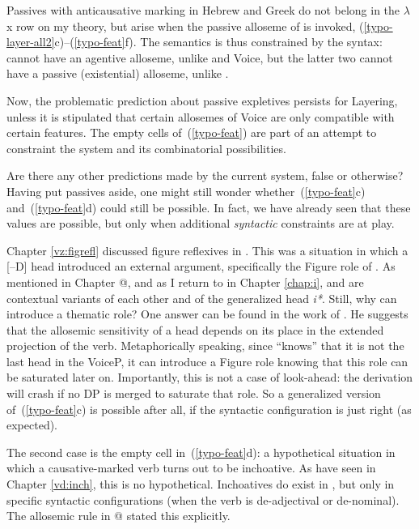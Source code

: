 Passives with anticausative marking in Hebrew and Greek do not belong in the $\lambda$x row on my theory, but arise when the passive alloseme of {\vd} is invoked, (\ref{typo-layer-all2}c)--(\ref{typo-feat}f). The semantics is thus constrained by the syntax: {\vz} cannot have an agentive alloseme, unlike {\vd} and Voice, but the latter two cannot have a passive (existential) alloseme, unlike {\vz}. %

Now, the problematic prediction about passive expletives persists for Layering, unless it is stipulated that certain allosemes of Voice are only compatible with certain features. The empty cells of~(\ref{typo-feat}) are part of an attempt to constraint the system and its combinatorial possibilities.

Are there any other predictions made by the current system, false or otherwise? Having put passives aside, one might still wonder whether~(\ref{typo-feat}c) and~(\ref{typo-feat}d) could still be possible. In fact, we have already seen that these values are possible, but only when additional \emph{syntactic} constraints are at play.

Chapter \ref{vz:figrefl} discussed figure reflexives in {\tnif}. This was a situation in which a [--D] head introduced an external argument, specifically the Figure role of {\pz}. As mentioned in Chapter @, and as I return to in Chapter \ref{chap:i}, {\pz} and {\vz} are contextual variants of each other and of the generalized head \emph{i*}. Still, why can {\pz} introduce a thematic role? One answer can be found in the work of \cite{wood15springer}. He suggests that the allosemic sensitivity of a head depends on its place in the extended projection of the verb. Metaphorically speaking, since {\pz} ``knows'' that it is not the last head in the VoiceP, it can introduce a Figure role knowing that this role can be saturated later on. Importantly, this is not a case of look-ahead: the derivation will crash if no DP is merged to saturate that role. So a generalized version of~(\ref{typo-feat}c) is possible after all, if the syntactic configuration is just right (as expected).

The second case is the empty cell in~(\ref{typo-feat}d): a hypothetical situation in which a causative-marked verb turns out to be inchoative. As have seen in Chapter \ref{vd:inch}, this is no hypothetical. Inchoatives do exist in {\thif}, but only in specific syntactic configurations (when the verb is de-adjectival or de-nominal). The allosemic rule in @ stated this explicitly.

